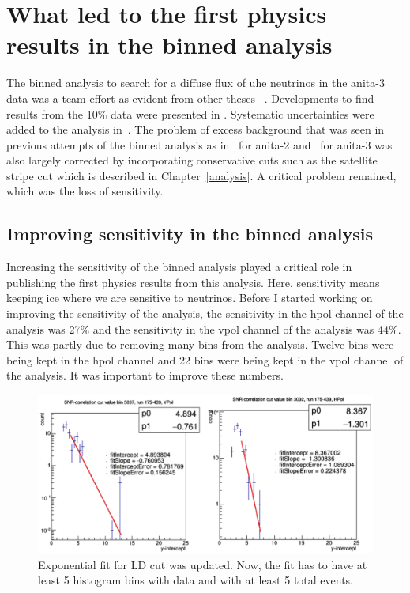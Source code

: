 \section{What led to the first physics results in the binned analysis}

The binned analysis to search for a diffuse flux of \gls{uhe} neutrinos in the \gls{anita}-3 data was a team effort as evident from other theses ~\cite{samStaffordThesis,jacobGordonThesis}. 
Developments to find results from the 10\% data were presented in \cite{samStaffordThesis}.
Systematic uncertainties were added to the analysis in~\cite{jacobGordonThesis}.
The problem of excess background that was seen in previous attempts of the binned analysis as in~\cite{brianDaileyThesis} for \gls{anita}-2 and~\cite{samStaffordThesis} for \gls{anita}-3 was also largely corrected by incorporating conservative cuts such as the satellite stripe cut which is described in Chapter~\ref{analysis}. A critical problem remained, which was the loss of sensitivity. 

\subsection{Improving sensitivity in the binned analysis}

Increasing the sensitivity of the binned analysis played a critical role in publishing the first physics results from this analysis. Here, sensitivity means keeping ice where we are sensitive to neutrinos. Before I started working on improving the sensitivity of the analysis, the sensitivity in the \gls{hpol} channel of the analysis was 27\% and the sensitivity in the \gls{vpol} channel of the analysis was 44\%. This was partly due to removing many bins from the analysis. Twelve bins were being kept in the \gls{hpol} channel and 22 bins were being kept in the \gls{vpol} channel of the analysis. It was important to improve these numbers. 

\begin{figure}
\centering
\includegraphics[width=1.0\textwidth]{figures/expo_fixed.png}
\caption{Exponential fit for LD cut was updated. Now, the fit has to have at least 5 histogram bins
with data and with at least 5 total events.}
\label{expo_fixed}
\end{figure}

